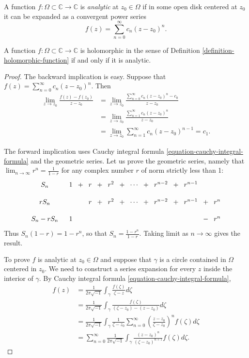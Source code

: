 \begin{definition}
\label{definition-analytic}
A function $f:\Omega \subset \mathbb{C} \to \mathbb{C}$ is
{\it analytic} at $z_0 \in \Omega$ if in some open disk centered at $z_0$ 
it can be expanded as a convergent power series
$$
f(z)=\sum_{n=0}^\infty c_n(z-z_0)^n.
$$
\end{definition}

\begin{theorem}
\label{theorem-holomorphic-iff-analytic}
A function $f:\Omega \subset \mathbb{C} \to \mathbb{C}$ is holomorphic
in the sense of Definition \ref{definition-holomorphic-function}
if and only if it is analytic.
\end{theorem}

\begin{proof}
The backward implication is easy.
Suppose that $f(z)=\sum_{n=0}^\infty c_n(z-z_0)^n$.
Then
\begin{align*}
\lim_{z \to z_0}\frac{f(z)-f(z_0)}{z-z_0} &=
\lim_{z\to z_0}\frac{\sum_{n=0}^\infty c_n(z-z_0)^n-c_0}{z-z_0}\\
&=\lim_{z\to z_0}\frac{\sum_{n=1}^\infty c_n(z-z_0)^n}{z-z_0}\\
&=\lim_{z\to z_0}\sum_{n=1}^\infty c_n(z-z_0)^{n-1}=c_1.
\end{align*}

\noindent
The forward implication uses Cauchy integral formula
\ref{equation-cauchy-integral-formula} and the geometric series.
Let us prove the geometric series, namely that
$\lim_{n\to\infty} r^n=\frac{1}{1-r}$ for any complex number $r$ of
norm strictly less than 1:
$$
\xymatrixcolsep{.2em}
\xymatrixrowsep{1em}
\xymatrix{
S_n & & 1 \ar@{}[r]&+&r\ar@{}[r]&+&r^2\ar@{}[r]&+&\cdots\ar@{}[r]&+
&r^{n-2}\ar@{}[r]&+&r^{n-1}\\
rS_n & & & & r\ar@{}[r]&+&r^2\ar@{}[r]&+&\cdots\ar@{}[r]&+
&r^{n-2}\ar@{}[r]&+&r^{n-1}\ar@{}[r]&+&r^n\\
S_n-rS_n& & 1 & & & & & & & & & & & - & r^n
}
$$
Thus $S_n(1-r)=1-r^n$, so that $S_n=\frac{1-r^n}{1-r}$.
Taking limit as $n\to \infty$ gives the result.

\medskip\noindent
To prove $f$ is analytic at $z_0\in \Omega$ 
and suppose that $\gamma$ is a circle contained in $\Omega$
centered in $z_0$.
We need to construct a series expansion for
every $z$ inside the interior of $\gamma$.
By Cauchy integral formula \ref{equation-cauchy-integral-formula},
\begin{align*}
f(z)&=\frac{1}{2\pi\sqrt{-1}}\int_\gamma \frac{f(\zeta)}{\zeta-z}d\zeta\\
&=\frac{1}{2\pi\sqrt{-1}}
\int_\gamma\frac{f(\zeta)}{(\zeta-z_0)-(z-z_0)}d\zeta\\
&=\frac{1}{2\pi\sqrt{-1}}
\int_\gamma \frac{1}{\zeta-z_0}
\sum_{n=0}^\infty\left(\frac{z-z_0}{\zeta-z_0}\right)^n
f(\zeta)d\zeta\\
&=\sum_{n=0}^\infty \frac{1}{2\pi\sqrt{-1}}
\int_\gamma\frac{(z-z_0)^n}{(\zeta-z_0)^{n+1}}f(\zeta)d\zeta.
\end{align*}


\end{proof}

